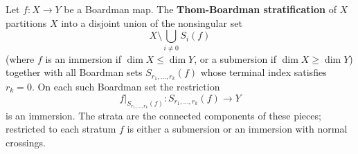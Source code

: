 Let $f: X \to Y$ be a Boardman map. The \textbf{Thom-Boardman stratification} of $X$ partitions $X$ into a disjoint union of the nonsingular set
$$X \setminus \bigcup_{i \neq 0} S_i(f)$$
(where $f$ is an immersion if $\dim X \le \dim Y$, or a submersion if $\dim X \ge \dim Y$) together with all Boardman sets $S_{r_1,\ldots,r_k}(f)$ whose terminal index satisfies $r_k = 0$. On each such Boardman set the restriction
$$f|_{S_{r_1,\ldots,r_k}(f)}: S_{r_1,\ldots,r_k}(f) \to Y$$
is an immersion. The strata are the connected components of these pieces; restricted to each stratum $f$ is either a submersion or an immersion with normal crossings.

